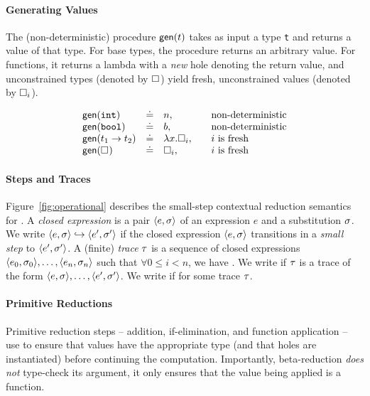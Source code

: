 \paragraph{Generating Values} The (non-deterministic) procedure $\mathsf{gen}(t)$
takes as input a type \texttt{t} and returns a value of that type. For base
types, the procedure returns an arbitrary value. For functions, it returns
a lambda with a \emph{new} hole denoting the return value, and unconstrained
types (denoted by $\square_{}$) yield fresh, unconstrained values
(denoted by $\square_{i}$).

$$
\begin{array}{lcll}
\mathsf{gen}(\mathtt{int})   & \doteq  & n, & \quad \text{non-deterministic} \\
\mathsf{gen}(\mathtt{bool})  & \doteq  & b, & \quad \text{non-deterministic} \\
\mathsf{gen}({t_1} \rightarrow t_2)   & \doteq & \lambda x. \square_{i}, & \quad \text{$i$ is fresh} \\
\mathsf{gen}(\square_{}) & \doteq & \square_{i}, & \quad \text{$i$ is fresh} \\
\end{array}
$$

\paragraph{Steps and Traces}
%
Figure~\ref{fig:operational} describes the small-step contextual
reduction semantics for \lang.
%
A \emph{closed expression} is a pair $\langle e, \sigma \rangle$ of an expression $e$
and a substitution $\sigma$.
%
We write $\langle e, \sigma \rangle \hookrightarrow \langle e', \sigma' \rangle$ if the closed expression $\langle e, \sigma \rangle$
transitions in a \emph{small step} to $\langle e', \sigma' \rangle$.
%
A (finite) \emph{trace} $\tau$ is a sequence of closed expressions
$\langle e_0, \sigma_0 \rangle, \ldots, \langle e_n, \sigma_n \rangle$ such that
$\forall 0 \leq i < n$, we have .
%
We write  if $\tau$ is a trace of the form
$\langle e, \sigma \rangle,\ldots,\langle e', \sigma' \rangle$.
%
We write  if 
for some trace $\tau$.

\paragraph{Primitive Reductions}
Primitive reduction steps -- addition, if-elimination, and
function application -- use \forcesym to ensure that values have the
appropriate type (and that holes are instantiated) before continuing the
computation. Importantly, beta-reduction \emph{does not} type-check its
argument, it only ensures that the value being applied is a function.

